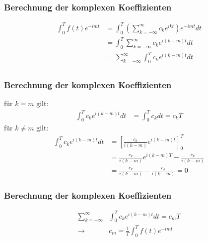 \begin{frame}
	\frametitle{Berechnung der komplexen Koeffizienten}
	\begin{align*}
		\int_{0}^{T}f(t) e^{-imt}
		&= \int_{0}^{T} \left(\sum_{k=-\infty}^{\infty}c_k e^{ikt}\right) e^{-imt} dt \\
		&= \int_{0}^{T} \sum_{k=-\infty}^{\infty}c_k e^{i(k-m)t} dt \\
		&= \sum_{k=-\infty}^{\infty} \int_{0}^{T}c_k e^{i(k-m)t} dt \\
	\end{align*}
\end{frame}

\begin{frame}
	\frametitle{Berechnung der komplexen Koeffizienten}
	für $k = m$ gilt:
	\begin{align*}
		\int_{0}^{T}c_k e^{i(k-m)t} dt &= \int_{0}^{T}c_k dt = c_k T
	\end{align*}
	für $k \ne m$ gilt:
	\begin{align*}
		\int_{0}^{T}c_k e^{i(k-m)t} dt &= \left[\frac{c_k}{i(k-m)}e^{i(k-m)t}\right]_{0}^{T} \\
		&= \frac{c_k}{i(k-m)}e^{i(k-m)T} - \frac{c_k}{i(k-m)} \\
		&= \frac{c_k}{i(k-m)} - \frac{c_k}{i(k-m)} = 0
	\end{align*}
\end{frame}

\begin{frame}
	\frametitle{Berechnung der komplexen Koeffizienten}
	\begin{align*}
		\sum_{k=-\infty}^{\infty}& \int_{0}^{T}c_k e^{i(k-m)t} dt = c_mT \\
		\to \quad & c_m = \frac{1}{T} \int_{0}^{T}f(t) e^{-imt}
	\end{align*}
\end{frame}